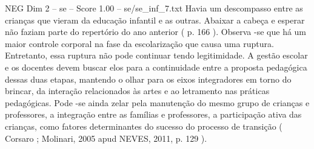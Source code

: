 \begin{textsample}{NEG Dim 2 – se – Score 1.00 – se/se\_inf\_7.txt}
Havia um descompasso entre as crianças que vieram da educação infantil e as outras.
Abaixar a cabeça e esperar não faziam parte do repertório do ano anterior ( p. 166 ).
Observa -se que há um maior controle corporal na fase da escolarização que causa uma ruptura.
Entretanto, essa ruptura não pode continuar tendo legitimidade.
A gestão escolar e os docentes devem buscar elos para a continuidade entre a proposta pedagógica dessas duas etapas, mantendo o olhar para os eixos integradores em torno do brincar, da interação relacionados às artes e ao letramento nas práticas pedagógicas.
Pode -se ainda zelar pela manutenção do mesmo grupo de crianças e professores, a integração entre as famílias e professores, a participação ativa das crianças, como fatores determinantes do sucesso do processo de transição ( Corsaro ; Molinari, 2005 apud NEVES, 2011, p. 129 ).

\end{textsample}

